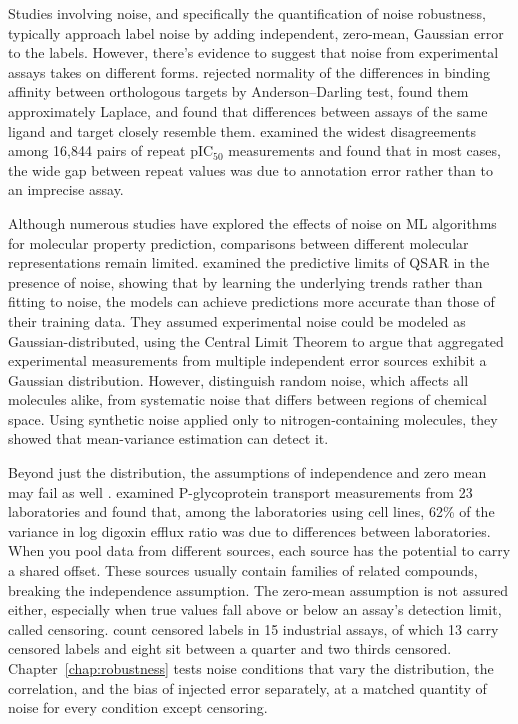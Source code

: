Studies involving noise, and specifically the quantification of noise robustness, typically approach label noise by adding independent, zero-mean, Gaussian error to the labels. However, there's evidence to suggest that noise from experimental assays takes on different forms. \citet{Kruger2012} rejected normality of the differences in binding affinity between orthologous targets by Anderson--Darling test, found them approximately Laplace, and found that differences between assays of the same ligand and target closely resemble them. \citet{Kalliokoski2013} examined the widest disagreements among 16,844 pairs of repeat pIC$_{50}$ measurements and found that in most cases, the wide gap between repeat values was due to annotation error rather than to an imprecise assay. 

Although numerous studies have explored the effects of noise on ML algorithms for molecular property prediction, comparisons between different molecular representations remain limited. \citet{Kolmar2021} examined the predictive limits of QSAR in the presence of noise, showing that by learning the underlying trends rather than fitting to noise, the models can achieve predictions more accurate than those of their training data. They assumed experimental noise could be modeled as Gaussian-distributed, using the Central Limit Theorem to argue that aggregated experimental measurements from multiple independent error sources exhibit a Gaussian distribution. However, \citet{Heid2023} distinguish random noise, which affects all molecules alike, from systematic noise that differs between regions of chemical space. Using synthetic noise applied only to nitrogen-containing molecules, they showed that mean-variance estimation can detect it.

Beyond just the distribution, the assumptions of independence and zero mean may fail as well \citep{Lambert2023autocorrelated}. \citet{Bentz2013} examined P-glycoprotein transport measurements from 23 laboratories and found that, among the laboratories using cell lines, 62\% of the variance in log digoxin efflux ratio was due to differences between laboratories. When you pool data from different sources, each source has the potential to carry a shared offset. These sources usually contain families of related compounds, breaking the independence assumption. The zero-mean assumption is not assured either, especially when true values fall above or below an assay's detection limit, called censoring. \citet{Svensson2025} count censored labels in 15 industrial assays, of which 13 carry censored labels and eight sit between a quarter and two thirds censored. Chapter~\ref{chap:robustness} tests noise conditions that vary the distribution, the correlation, and the bias of injected error separately, at a matched quantity of noise for every condition except censoring.

